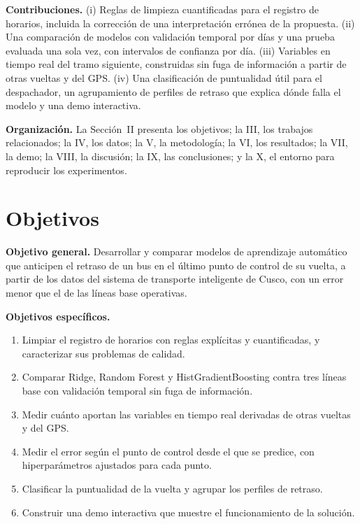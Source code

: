 \documentclass[conference,spanish]{IEEEtran}
\begin{document}
\textbf{Contribuciones.} (i) Reglas de limpieza cuantificadas para el registro de horarios, incluida la corrección de una interpretación errónea de la propuesta. (ii) Una comparación de modelos con validación temporal por días y una prueba evaluada una sola vez, con intervalos de confianza por día. (iii) Variables en tiempo real del tramo siguiente, construidas sin fuga de información a partir de otras vueltas y del GPS. (iv) Una clasificación de puntualidad útil para el despachador, un agrupamiento de perfiles de retraso que explica dónde falla el modelo y una demo interactiva.

\textbf{Organización.} La Sección~II presenta los objetivos; la III, los trabajos relacionados; la IV, los datos; la V, la metodología; la VI, los resultados; la VII, la demo; la VIII, la discusión; la IX, las conclusiones; y la X, el entorno para reproducir los experimentos.

\section{Objetivos}

\textbf{Objetivo general.} Desarrollar y comparar modelos de aprendizaje automático que anticipen el retraso de un bus en el último punto de control de su vuelta, a partir de los datos del sistema de transporte inteligente de Cusco, con un error menor que el de las líneas base operativas.

\textbf{Objetivos específicos.}
\begin{enumerate}
    \item Limpiar el registro de horarios con reglas explícitas y cuantificadas, y caracterizar sus problemas de calidad.
    \item Comparar Ridge, Random Forest y HistGradientBoosting contra tres líneas base con validación temporal sin fuga de información.
    \item Medir cuánto aportan las variables en tiempo real derivadas de otras vueltas y del GPS.
    \item Medir el error según el punto de control desde el que se predice, con hiperparámetros ajustados para cada punto.
    \item Clasificar la puntualidad de la vuelta y agrupar los perfiles de retraso.
    \item Construir una demo interactiva que muestre el funcionamiento de la solución.
\end{enumerate}
\end{document}
